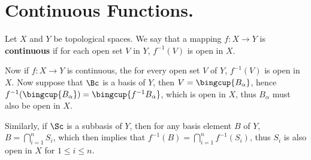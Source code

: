 
\section{Continuous Functions.}

\begin{definition}
    Let $X$ and  $Y$ be topological spaces. We say that a mapping $f:X
    \rightarrow Y$ is  \textbf{continuous} if for each open set $V$ in  $Y$,
    $f^{-1}(V)$ is open in $X$.
\end{definition}

Now if $f:X \rightarrow Y$ is continuous, the for every open set  $V$ of  $Y$,
$f^{-1}(V)$ is open in  $X$. Now suppose that  $\Bc$ is a basis of  $Y$, then
$V=\bingcup{B_{\alpha}}$, hence
$f^{-1}(\bingcup{B_{\alpha}})=\bingcup{f^{-1}{B_{\alpha}}}$, which is open in
$X$, thus  $B_{\alpha}$ must also be open in  $X$.

Similarly, if $\Sc$ is a subbasis of  $Y$, then for any basis element  $B$ of
$Y$,  $B=\bigcap_{i=1}^{n}{S_i}$, which then implies that
$f^{-1}(B)=\bigcap_{i=1}^{n}{f^{-1}(S_i)}$, thus  $S_i$ is also open in  $X$ for
 $1 \leq i \leq n$.

